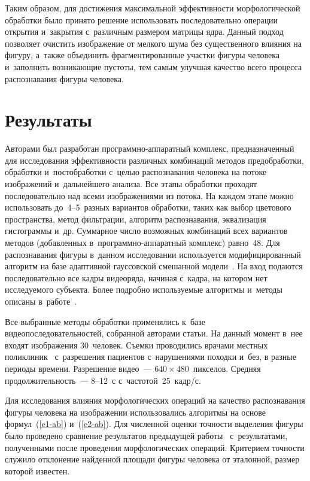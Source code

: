 \begin{multicols}{2}
  Таким образом, для достижения максимальной эффективности
морфологической обработки было принято решение использовать
последовательно операции открытия и~закрытия с~различным размером
матрицы ядра. Данный подход позволяет очистить изображение от мелкого
шума без существенного влияния на фигуру, а~также объединить
фрагментированные участки фигуры человека и~заполнить возникающие
пустоты, тем самым улучшая качество всего процесса распознавания фигуры
человека.

\section{Результаты}

  Авторами был разработан программно-ап\-па\-рат\-ный комплекс,
предназначенный для исследования эффективности различных комбинаций
методов предобработки, обработки и~постобработки с~целью распознавания
человека на потоке изоб\-ра\-же\-ний и~дальнейшего анализа. Все этапы обработки
проходят последовательно над всеми изоб\-ра\-же\-ни\-ями из потока. На каждом
этапе можно использовать до~4--5~разных вариантов обработки, таких как
выбор цветового пространства, метод фильтрации, алгоритм распознавания,
эквализация гистограммы и~др. Суммарное число возможных комбинаций всех
вариантов методов (добавленных в~программно-аппаратный комплекс)
равно~48. Для распознавания фигуры в~данном исследовании используется
модифицированный алгоритм на базе адаптивной гауссовской смешанной
модели~\cite{14-ab}. На вход подаются последовательно все кадры видеоряда,
начиная с~кадра, на котором нет исследуемого субъекта. Более подробно
используемые алгоритмы и~методы описаны в~работе~\cite{9-ab}.

  Все выбранные методы обработки применялись к~базе
видеопоследовательностей, собранной авторами статьи. На данный момент в~нее входят 
изоб\-ра\-же\-ния 30~человек. Съемки проводились врачами местных
поликлиник~\cite{8-ab} с~разрешения пациентов с~нарушениями походки и~без,
в разные периоды времени. Разрешение видео~--- $640\times 480$~пикселов.
Средняя продолжительность~--- 8--12~с с~частотой~25~кадр/с.

  Для исследования влияния морфологических операций на качество
распознавания фигуры человека на изображении использовались алгоритмы на
основе формул~(\ref{e1-ab}) и~(\ref{e2-ab}). Для численной оценки точности
выделения фигуры было проведено сравнение результатов предыдущей
работы~\cite{9-ab} с~результатами, полученными после проведения
морфологических операций. Критерием точности служило отклонение
найденной площади фигуры человека от эталонной, размер которой известен.


\end{multicols}
